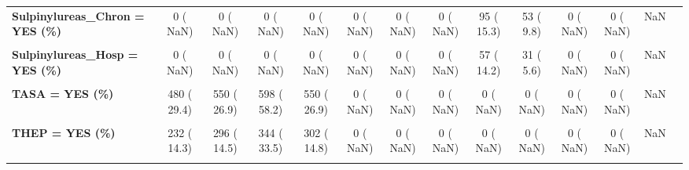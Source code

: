 \documentclass[
]{article}
\begin{document}
\begin{table}[H]
\begin{tabular}[t]{>{\raggedright\arraybackslash}p{5em}ccccccccccccc}
\textbf{Sulpinylureas\_Chron = YES (\%)} & 0 (  NaN) & 0 (  NaN) & 0 (  NaN) & 0 (  NaN) & 0 (  NaN) & 0 (  NaN) & 0 (  NaN) & 95 ( 15.3) & 53 (  9.8) & 0 (  NaN) & 0 (  NaN) & NaN & \\
\textbf{\cellcolor{gray!10}{Sulpinylureas\_Disch = YES (\%)}} & \cellcolor{gray!10}{0 (  NaN)} & \cellcolor{gray!10}{0 (  NaN)} & \cellcolor{gray!10}{0 (  NaN)} & \cellcolor{gray!10}{0 (  NaN)} & \cellcolor{gray!10}{0 (  NaN)} & \cellcolor{gray!10}{0 (  NaN)} & \cellcolor{gray!10}{0 (  NaN)} & \cellcolor{gray!10}{83 ( 19.6)} & \cellcolor{gray!10}{31 (  5.6)} & \cellcolor{gray!10}{0 (  NaN)} & \cellcolor{gray!10}{0 (  NaN)} & \cellcolor{gray!10}{NaN} & \cellcolor{gray!10}{}\\
\textbf{Sulpinylureas\_Hosp = YES (\%)} & 0 (  NaN) & 0 (  NaN) & 0 (  NaN) & 0 (  NaN) & 0 (  NaN) & 0 (  NaN) & 0 (  NaN) & 57 ( 14.2) & 31 (  5.6) & 0 (  NaN) & 0 (  NaN) & NaN & \\
\textbf{\cellcolor{gray!10}{TANT = YES (\%)}} & \cellcolor{gray!10}{2 (  0.1)} & \cellcolor{gray!10}{2 (  0.1)} & \cellcolor{gray!10}{0 (  0.0)} & \cellcolor{gray!10}{0 (  NaN)} & \cellcolor{gray!10}{0 (  NaN)} & \cellcolor{gray!10}{0 (  NaN)} & \cellcolor{gray!10}{0 (  NaN)} & \cellcolor{gray!10}{0 (  NaN)} & \cellcolor{gray!10}{0 (  NaN)} & \cellcolor{gray!10}{0 (  NaN)} & \cellcolor{gray!10}{0 (  NaN)} & \cellcolor{gray!10}{NaN} & \cellcolor{gray!10}{}\\
\textbf{TASA = YES (\%)} & 480 ( 29.4) & 550 ( 26.9) & 598 ( 58.2) & 550 ( 26.9) & 0 (  NaN) & 0 (  NaN) & 0 (  NaN) & 0 (  NaN) & 0 (  NaN) & 0 (  NaN) & 0 (  NaN) & NaN & \\
\textbf{\cellcolor{gray!10}{TCPR\_DCS = YES (\%)}} & \cellcolor{gray!10}{43 (  2.4)} & \cellcolor{gray!10}{34 (  1.7)} & \cellcolor{gray!10}{29 (  1.4)} & \cellcolor{gray!10}{40 (  2.0)} & \cellcolor{gray!10}{0 (  NaN)} & \cellcolor{gray!10}{42 (  2.4)} & \cellcolor{gray!10}{67 (  3.6)} & \cellcolor{gray!10}{33 (  1.8)} & \cellcolor{gray!10}{40 (  2.2)} & \cellcolor{gray!10}{50 (  2.9)} & \cellcolor{gray!10}{33 (  1.9)} & \cellcolor{gray!10}{NaN} & \cellcolor{gray!10}{}\\
\textbf{THEP = YES (\%)} & 232 ( 14.3) & 296 ( 14.5) & 344 ( 33.5) & 302 ( 14.8) & 0 (  NaN) & 0 (  NaN) & 0 (  NaN) & 0 (  NaN) & 0 (  NaN) & 0 (  NaN) & 0 (  NaN) & NaN & \\
\textbf{\cellcolor{gray!10}{THR\_30D = YES (\%)}} & \cellcolor{gray!10}{0 (  NaN)} & \cellcolor{gray!10}{0 (  NaN)} & \cellcolor{gray!10}{0 (  NaN)} & \cellcolor{gray!10}{0 (  NaN)} & \cellcolor{gray!10}{30 (  1.7)} & \cellcolor{gray!10}{15 (  0.8)} & \cellcolor{gray!10}{21 (  1.1)} & \cellcolor{gray!10}{18 (  1.0)} & \cellcolor{gray!10}{9 (  0.6)} & \cellcolor{gray!10}{1 (  0.1)} & \cellcolor{gray!10}{4 (  0.3)} & \cellcolor{gray!10}{NaN} & \cellcolor{gray!10}{}\\

\end{tabular}
\end{table}
\end{document}
